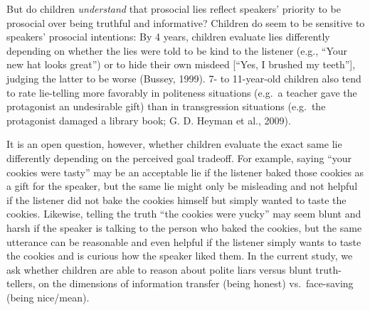 \documentclass[oneside]{report}
\begin{document}
But do children \emph{understand} that prosocial lies reflect speakers'
priority to be prosocial over being truthful and informative? Children
do seem to be sensitive to speakers' prosocial intentions: By 4 years,
children evaluate lies differently depending on whether the lies were
told to be kind to the listener (e.g., ``Your new hat looks great'') or
to hide their own misdeed {[}``Yes, I brushed my teeth''{]}, judging the
latter to be worse (Bussey, 1999). 7- to 11-year-old children also tend
to rate lie-telling more favorably in politeness situations (e.g.~a
teacher gave the protagonist an undesirable gift) than in transgression
situations (e.g.~the protagonist damaged a library book; G. D. Heyman et
al., 2009).

It is an open question, however, whether children evaluate the exact
same lie differently depending on the perceived goal tradeoff. For
example, saying ``your cookies were tasty'' may be an acceptable lie if
the listener baked those cookies as a gift for the speaker, but the same
lie might only be misleading and not helpful if the listener did not
bake the cookies himself but simply wanted to taste the cookies.
Likewise, telling the truth ``the cookies were yucky'' may seem blunt
and harsh if the speaker is talking to the person who baked the cookies,
but the same utterance can be reasonable and even helpful if the
listener simply wants to taste the cookies and is curious how the
speaker liked them. In the current study, we ask whether children are
able to reason about polite liars versus blunt truth-tellers, on the
dimensions of information transfer (being honest) vs.~face-saving (being
nice/mean).
\end{document}
